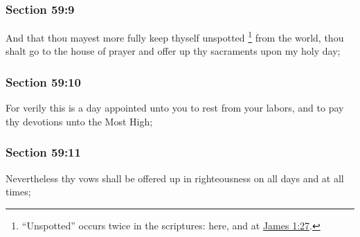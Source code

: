 	\subsubsection{Section 59:9} %
		\label{DC59-9}

		And that thou mayest more fully keep thyself unspotted%
		\footnote{%
			``Unspotted'' occurs twice in the scriptures: here, and at \hyperref[JAMES-1-27]{James 1:27}.
			}
		from the world, thou shalt go to the house of prayer and offer up thy sacraments upon my holy day;


	\subsubsection{Section 59:10} %
		\label{DC59-10}

		For verily this is a day appointed unto you to rest from your labors, and to pay thy devotions unto the Most High;


	\subsubsection{Section 59:11} %
		\label{DC59-11}

		Nevertheless thy vows shall be offered up in righteousness on all days and at all times;


